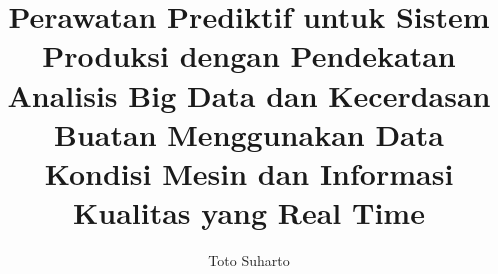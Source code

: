 \documentclass[final,lualatex]{itbdisertasi}
\title{Perawatan Prediktif untuk Sistem Produksi dengan Pendekatan
       Analisis Big Data dan Kecerdasan Buatan Menggunakan Data
       Kondisi Mesin dan Informasi Kualitas yang Real Time}
\author{Toto Suharto}
\begin{document}
\sampul
\halamanjudul

\itbfrontmatter

\halamanpengesahan
\pedomanpenggunaan





\renewcommand{\contentsname}{DAFTAR ISI}
\tableofcontents
\cleardoublepage

\renewcommand{\listfigurename}{DAFTAR GAMBAR}
\listoffigures
\cleardoublepage

\renewcommand{\listtablename}{DAFTAR TABEL}
\listoftables
\cleardoublepage



\itbmainmatter








\cleardoublepage
\printbibliography[title={DAFTAR PUSTAKA},heading=bibintoc]

\cleardoublepage
\appendix








\end{document}
